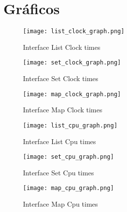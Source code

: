 \section{Gráficos}\label{sec:graphics}
	\begin{figure}[ht]
		\centering
		\texttt{[image: list\_clock\_graph.png]}
		\caption{Interface List Clock times}
		\label{fig:list_clock}
	\end{figure}

	\begin{figure}[ht]
		\centering
		\texttt{[image: set\_clock\_graph.png]}
		\caption{Interface Set Clock times}
		\label{fig:set_clock}
	\end{figure}

	\begin{figure}[ht]
		\centering
		\texttt{[image: map\_clock\_graph.png]}
		\caption{Interface Map Clock times}
		\label{fig:map_clock}
	\end{figure}

	\begin{figure}[ht]
		\centering
		\texttt{[image: list\_cpu\_graph.png]}
		\caption{Interface List Cpu times}
		\label{fig:list_cpu}
	\end{figure}

	\begin{figure}[ht]
		\centering
		\texttt{[image: set\_cpu\_graph.png]}
		\caption{Interface Set Cpu times}
		\label{fig:set_cpu}
	\end{figure}

	\begin{figure}[ht]
		\centering
		\texttt{[image: map\_cpu\_graph.png]}
		\caption{Interface Map Cpu times}
		\label{fig:map_cpu}
	\end{figure}

